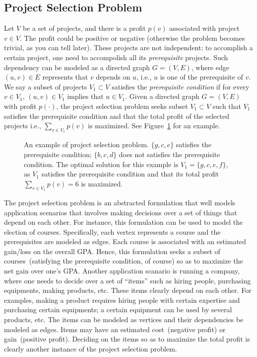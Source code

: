 
\subsection*{Project Selection Problem}

Let $V$ be a set of projects, and there is a profit $p(v)$ associated with project $v\in V$.
The profit could be positive or negative (otherwise the problem becomes trivial, as you can tell later).
These projects are not independent: to accomplish a certain project, one need to accompolish all its
\emph{prerequisite} projects. Such dependency can be modeled as a directed graph $G = (V, E)$,
where edge $(u,v)\in E$ represents that $v$ depends on $u$, i.e., $u$ is one of the prerequisite of $v$.
We say a subset of projects $V_1\subset V$ satisfies the \emph{prerequisite condition} if for every $v\in V_1$, 
$(u,v)\in V_1$ implies that $u\in V_1$.
Given a directed graph $G = (V, E)$ with profit $p(\cdot)$, the project
selection problem seeks subset $V_1\subset V$ such that $V_1$ satisfies the
prerequisite condition and that the total profit of the selected projects i.e.,
$\sum_{v\in V_1} p(v)$ is maximized. See Figure~\ref{fig:ps1} for an example.

\begin{figure}[!h]
\centering{}
\caption{An example of project selection problem. $\{g,c,e\}$ satisfies the
prerequisite condition; $\{b,c,d\}$ does not satisfies the prerequisite condition.
The optimal solution for this example is $V_1 = \{g,c,e,f\}$, as $V_1$ satisfies the prerequisite condition
and that its total profit $\sum_{v\in V_1} p(v) = 6$ is maximized.}
\label{fig:ps1}
\end{figure}

The project selection problem is an abstracted formulation that well models
application scenarios that involves making decisions over a set of things that depend on each other.
For instance, this formulation can be used to model the election of courses. Specifically, each vertex
represents a course and the prerequisites are modeled as edges. Each course is associated with an estimated
gain/loss on the overall GPA. Hence, this formulation seeks a subset of courses~(satisfying the prerequisite condition, of course)
so as to maximize the net gain over one's GPA. Another application scanario is
running a company, where one needs to decide over a set of ``items'' such as
hiring people, purchasing equipments, making products, etc. These items clearly depend on each other.
For examples, making a product requires hiring people with certain expertise and purchasing certain equipments;
a certain equipment can be used by several products, etc. The items can be modeled as vertices and their dependencies
be modeled as edges. Items may have an estimated cost~(negative profit) or gain~(positive profit). Deciding on the items so as to
maximize the total profit is clearly another instance of the project selection problem.

